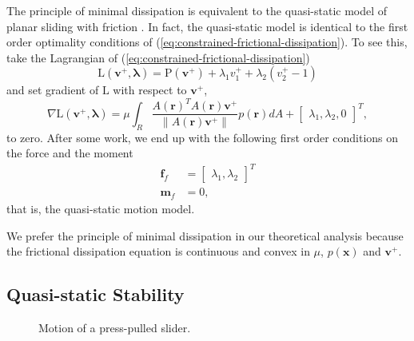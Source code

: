 \documentclass[conference]{IEEEtran}
\begin{document}
The principle of minimal dissipation is equivalent to the quasi-static
model of planar sliding with friction \cite{alexander1993bounds}.  In
fact, the quasi-static model is identical to the first order
optimality conditions of
(\ref{eq:constrained-frictional-dissipation}). To see this, take the
Lagrangian of (\ref{eq:constrained-frictional-dissipation})
\begin{equation}
  \mathrm{L}(\mathbf{v}^+,\mathbf{\lambda}) = \mathrm{P}(\mathbf{v}^+) + \lambda_1v^+_1 + \lambda_2(v^+_2-1)
\end{equation}
and set gradient of $\mathrm{L}$ with respect to $\mathbf{v}^+$,
\begin{equation}
  \nabla\mathrm{L}(\mathbf{v}^+,\mathbf{\lambda}) = \mu\int_R\frac{A(\mathbf{r})^TA(\mathbf{r})\mathbf{v}^+}{\lVert A(\mathbf{r})\mathbf{v}^+ \rVert} p(\mathbf{r}) dA + \begin{bmatrix}\lambda_1, \lambda_2, 0\end{bmatrix}^T,
\end{equation}
to zero. After some work, we end up with the following first order
conditions on the force and the moment
\begin{align}
  \mathbf{f}_f &= \begin{bmatrix}\lambda_1, \lambda_2\end{bmatrix}^T\\
  \mathbf{m}_f &= 0,
\end{align}
that is, the quasi-static motion model.

We prefer the principle of minimal dissipation in our theoretical
analysis because the frictional dissipation equation is continuous and
convex in $\mu$, $p(\mathbf{x})$ and $\mathbf{v}^+$.

\subsection{Quasi-static Stability}

\begin{figure}
  \centering
  \def\iangle{35} %
  \caption{Motion of a press-pulled slider.}
  \label{fig:presspull-motion}
\end{figure}
\end{document}
